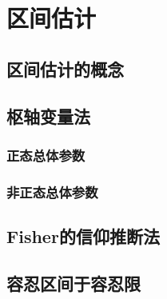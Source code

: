 \chapter{区间估计}

\section{区间估计的概念}

\section{枢轴变量法}

\subsection{正态总体参数}

\subsection{非正态总体参数}

\section{Fisher的信仰推断法}

\section{容忍区间于容忍限}
